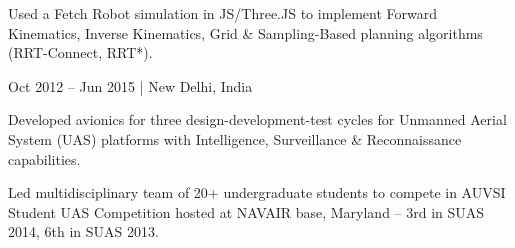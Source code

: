 \documentclass[letterpaper]{deedy-resume} %
\begin{document}
\begin{minipage}[t]{0.73\textwidth}
\begin{tightitemize}
\item Used a Fetch Robot simulation in JS/Three.JS to implement Forward Kinematics, Inverse Kinematics, Grid \& Sampling-Based planning algorithms (RRT-Connect, RRT*).
\end{tightitemize}



Oct 2012 – Jun 2015 | New Delhi, India
\begin{tightitemize}
\item Developed avionics for three design-development-test cycles for Unmanned Aerial System (UAS) platforms with Intelligence, Surveillance \& Reconnaissance capabilities.
\item Led multidisciplinary team of 20+ undergraduate students to compete in AUVSI Student UAS Competition hosted at NAVAIR base, Maryland – 3rd in SUAS 2014, 6th in SUAS 2013.
\end{tightitemize}



\end{minipage}
\end{document}

